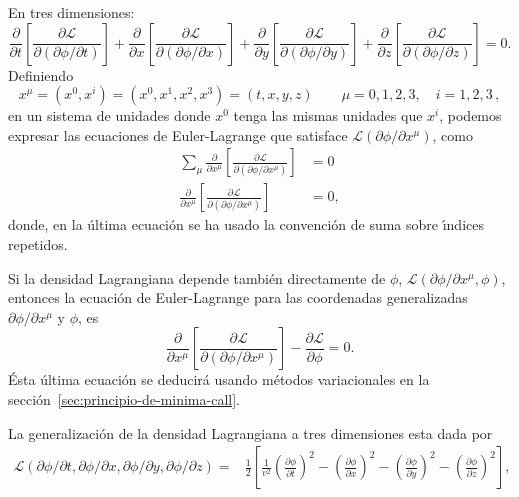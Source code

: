 En tres dimensiones:
\begin{equation}
  \label{eq:eelcalls1m}
\frac{\partial}{\partial t}
  \left[
    \frac{\partial\mathcal{L}}{\partial
      (\partial\phi/\partial t)}
  \right]+\frac{\partial}{\partial x}
  \left[
    \frac{\partial\mathcal{L}}{\partial
      (\partial\phi/\partial x)}
  \right]+\frac{\partial}{\partial y}
  \left[
    \frac{\partial\mathcal{L}}{\partial
      (\partial\phi/\partial y)}
  \right]+\frac{\partial}{\partial z}
  \left[
    \frac{\partial\mathcal{L}}{\partial
      (\partial\phi/\partial z)}
  \right]=0.
\end{equation}
Definiendo
\begin{equation}
  \label{eq:xmu}
  x^\mu=(x^0,x^i)=(x^0,x^1,x^2,x^3)=(t,x,y,z) \qquad \mu=0,1,2,3,\quad i=1,2,3\,,
\end{equation}
en un sistema de unidades donde $x^0$ tenga las mismas unidades que
$x^i$, podemos expresar las ecuaciones de Euler-Lagrange que satisface
$\mathcal{L}(\partial\phi/\partial x^\mu)$, como
\begin{align*}
 \sum_\mu\frac{\partial}{\partial x^\mu}
  \left[
    \frac{\partial\mathcal{L}}{\partial
      (\partial\phi/\partial x^\mu)}
  \right]&=0\\
 \frac{\partial}{\partial x^\mu}
  \left[
    \frac{\partial\mathcal{L}}{\partial
      (\partial\phi/\partial x^\mu)}
  \right]&=0,
\end{align*}
donde, en la \'ultima ecuaci\'on se ha usado la convenci\'on de suma sobre
\'\i ndices repetidos. 

Si la densidad Lagrangiana depende tambi\'en directamente de $\phi$,
$\mathcal{L}(\partial\phi/\partial x^\mu,\phi)$, entonces la ecuaci\'on de Euler-Lagrange para
las coordenadas generalizadas  $\partial\phi/\partial x^\mu$ y $\phi$, es
\begin{equation}
\label{eq:eelcallf}
 \frac{\partial}{\partial x^\mu}
  \left[
    \frac{\partial\mathcal{L}}{\partial
      (\partial\phi/\partial x^\mu)}
  \right]-\frac{\partial\mathcal{L}}{\partial\phi}=0.
\end{equation}
\'Esta \'ultima ecuaci\'on se deducir\'a usando m\'etodos variacionales en la
secci\'on~\ref{sec:principio-de-minima-call}.

La generalización de la densidad Lagrangiana a tres dimensiones esta dada por
\begin{align}
  \label{eq:dlc3d}
  \mathcal{L}(\partial\phi/\partial t,\partial\phi/\partial x,\partial\phi/\partial y,\partial\phi/\partial z)
=&\frac{1}{2}
\left[
  \frac{1}{v^2}\left(\frac{\partial\phi}{\partial t}\right)^2-\left(\frac{\partial\phi}{\partial x}\right)^2-\left(\frac{\partial\phi}{\partial y}\right)^2-\left(\frac{\partial\phi}{\partial z}\right)^2
\right],
\end{align}



